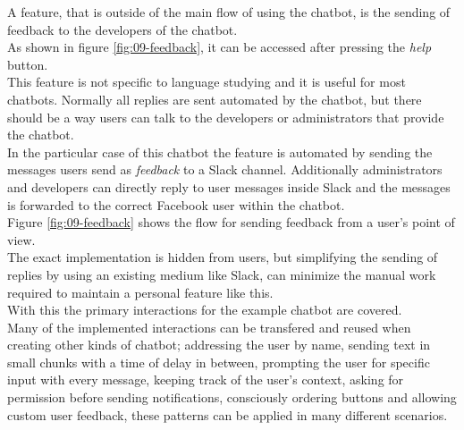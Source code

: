 \label{slackhook}

A feature, that is outside of the main flow of using the chatbot, is the sending of feedback to the developers of the chatbot.
\\
As shown in figure \ref{fig:09-feedback}, it can be accessed after pressing the \emph{help} button.
\\
This feature is not specific to language studying and it is useful for most chatbots.
Normally all replies are sent automated by the chatbot,
but there should be a way users can talk to the developers or administrators that provide the chatbot.
\\
In the particular case of this chatbot the feature is automated by sending the messages users send as \emph{feedback}
to a Slack channel\cite{slack}.
Additionally administrators and developers can directly reply to user messages inside Slack
and the messages is forwarded to the correct Facebook user within the chatbot.
\\
Figure \ref{fig:09-feedback} shows the flow for sending feedback from a user's point of view.
\\
The exact implementation is hidden from users,
but simplifying the sending of replies by using an existing medium like Slack,
can minimize the manual work required to maintain a personal feature like this.
\\


With this the primary interactions for the example chatbot are covered.
\\
Many of the implemented interactions can be transfered and reused when creating other kinds of chatbot;
addressing the user by name,
sending text in small chunks with a time of delay in between,
prompting the user for specific input with every message,
keeping track of the user's context,
asking for permission before sending notifications,
consciously ordering buttons and
allowing custom user feedback,
these patterns can be applied in many different scenarios.

